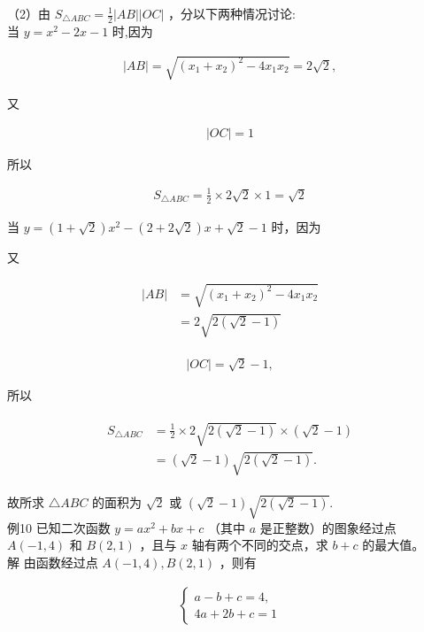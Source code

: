 \documentclass[10pt]{article}
\begin{document}
（2）由 $S_{\triangle A B C}=\frac{1}{2}|A B||O C|$ ，分以下两种情况讨论:\\
当 $y=x^{2}-2 x-1$ 时,因为

\begin{align*}
|A B|=\sqrt{\left(x_{1}+x_{2}\right)^{2}-4 x_{1} x_{2}}=2 \sqrt{2},
\end{align*}

又

\begin{align*}
|O C|=1
\end{align*}

所以

\begin{align*}
S_{\triangle A B C}=\frac{1}{2} \times 2 \sqrt{2} \times 1=\sqrt{2}
\end{align*}

当 $y=(1+\sqrt{2}) x^{2}-(2+2 \sqrt{2}) x+\sqrt{2}-1$ 时，因为

又

\begin{align*}
\begin{aligned}
|A B| & =\sqrt{\left(x_{1}+x_{2}\right)^{2}-4 x_{1} x_{2}} \\
& =2 \sqrt{2(\sqrt{2}-1)}
\end{aligned}
\end{align*}

\begin{align*}
|O C|=\sqrt{2}-1,
\end{align*}

所以

\begin{align*}
\begin{aligned}
S_{\triangle A B C} & =\frac{1}{2} \times 2 \sqrt{2(\sqrt{2}-1)} \times(\sqrt{2}-1) \\
& =(\sqrt{2}-1) \sqrt{2(\sqrt{2}-1)} .
\end{aligned}
\end{align*}

故所求 $\triangle A B C$ 的面积为 $\sqrt{2}$ 或 $(\sqrt{2}-1) \sqrt{2(\sqrt{2}-1)}$.\\
例10 已知二次函数 $y=a x^{2}+b x+c$ （其中 $a$ 是正整数）的图象经过点\\
$A(-1,4)$ 和 $B(2,1)$ ，且与 $x$ 轴有两个不同的交点，求 $b+c$ 的最大值。\\
解 由函数经过点 $A(-1,4), B(2,1)$ ，则有

\begin{align*}
\left\{\begin{array}{l}
a-b+c=4, \\
4 a+2 b+c=1
\end{array}\right.
\end{align*}
\end{document}
